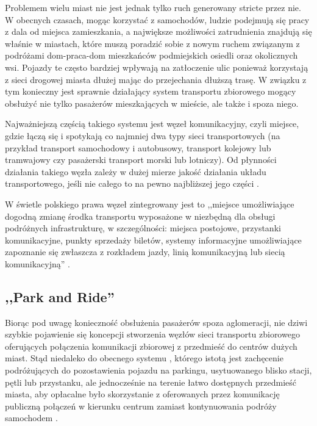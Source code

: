 \documentclass[twoside,12pt]{article}
\begin{document}
	Problemem wielu miast nie jest jednak tylko ruch generowany stricte przez nie. W obecnych czasach, mogąc korzystać z samochodów, ludzie podejmują się pracy z dala od miejsca zamieszkania, a największe możliwości zatrudnienia znajdują się właśnie w miastach, które muszą poradzić sobie z nowym ruchem związanym z podróżami dom-praca-dom mieszkańców podmiejskich osiedli oraz okolicznych wsi. Pojazdy te często bardziej wpływają na zatłoczenie ulic ponieważ korzystają z sieci drogowej miasta dłużej mając do przejechania dłuższą trasę. W związku z tym konieczny jest sprawnie działający system transportu zbiorowego mogący obsłużyć nie tylko pasażerów mieszkających w mieście, ale także i spoza niego. 
		
	Najważniejszą częścią takiego systemu jest węzeł komunikacyjny, czyli miejsce, gdzie łączą się i spotykają co najmniej dwa typy sieci transportowych (na przykład transport samochodowy i autobusowy, transport kolejowy lub tramwajowy czy pasażerski transport morski lub lotniczy). Od płynności działania takiego węzła zależy w dużej mierze jakość działania układu transportowego, jeśli nie całego to na pewno najbliższej jego części \cite{urbanistyka}. 
	
	W świetle polskiego prawa węzeł zintegrowany jest to ,,miejsce umożliwiające dogodną zmianę środka transportu wyposażone w niezbędną dla obsługi podróżnych infrastrukturę, w szczególności: miejsca postojowe, przystanki komunikacyjne, punkty sprzedaży biletów, systemy informacyjne umożliwiające zapoznanie się zwłaszcza z rozkładem jazdy, linią komunikacyjną lub siecią komunikacyjną'' \cite{ustawa_transport}.
	
	\subsection{,,Park and Ride''}
	
	Biorąc pod uwagę konieczność obsłużenia pasażerów spoza aglomeracji, nie dziwi szybkie pojawienie się koncepcji stworzenia węzłów sieci transportu zbiorowego oferujących połączenia komunikacji zbiorowej z przedmieść do centrów dużych miast. Stąd niedaleko do obecnego systemu \pnr{}, którego istotą jest zachęcenie podróżujących do pozostawienia pojazdu na parkingu, usytuowanego blisko stacji, pętli lub przystanku, ale jednocześnie na terenie łatwo dostępnych przedmieść miasta, aby opłacalne było skorzystanie z oferowanych przez komunikację publiczną połączeń w kierunku centrum zamiast kontynuowania podróży samochodem \cite{szarata}.	
	
\end{document}
